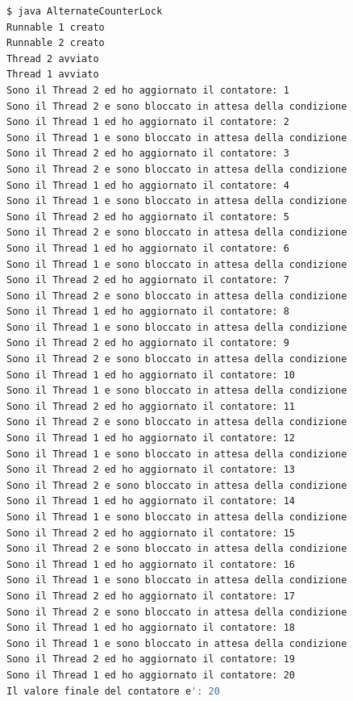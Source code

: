 \begin{lstlisting}[language=Bash]
$ java AlternateCounterLock
Runnable 1 creato
Runnable 2 creato
Thread 2 avviato
Thread 1 avviato
Sono il Thread 2 ed ho aggiornato il contatore: 1
Sono il Thread 2 e sono bloccato in attesa della condizione
Sono il Thread 1 ed ho aggiornato il contatore: 2
Sono il Thread 1 e sono bloccato in attesa della condizione
Sono il Thread 2 ed ho aggiornato il contatore: 3
Sono il Thread 2 e sono bloccato in attesa della condizione
Sono il Thread 1 ed ho aggiornato il contatore: 4
Sono il Thread 1 e sono bloccato in attesa della condizione
Sono il Thread 2 ed ho aggiornato il contatore: 5
Sono il Thread 2 e sono bloccato in attesa della condizione
Sono il Thread 1 ed ho aggiornato il contatore: 6
Sono il Thread 1 e sono bloccato in attesa della condizione
Sono il Thread 2 ed ho aggiornato il contatore: 7
Sono il Thread 2 e sono bloccato in attesa della condizione
Sono il Thread 1 ed ho aggiornato il contatore: 8
Sono il Thread 1 e sono bloccato in attesa della condizione
Sono il Thread 2 ed ho aggiornato il contatore: 9
Sono il Thread 2 e sono bloccato in attesa della condizione
Sono il Thread 1 ed ho aggiornato il contatore: 10
Sono il Thread 1 e sono bloccato in attesa della condizione
Sono il Thread 2 ed ho aggiornato il contatore: 11
Sono il Thread 2 e sono bloccato in attesa della condizione
Sono il Thread 1 ed ho aggiornato il contatore: 12
Sono il Thread 1 e sono bloccato in attesa della condizione
Sono il Thread 2 ed ho aggiornato il contatore: 13
Sono il Thread 2 e sono bloccato in attesa della condizione
Sono il Thread 1 ed ho aggiornato il contatore: 14
Sono il Thread 1 e sono bloccato in attesa della condizione
Sono il Thread 2 ed ho aggiornato il contatore: 15
Sono il Thread 2 e sono bloccato in attesa della condizione
Sono il Thread 1 ed ho aggiornato il contatore: 16
Sono il Thread 1 e sono bloccato in attesa della condizione
Sono il Thread 2 ed ho aggiornato il contatore: 17
Sono il Thread 2 e sono bloccato in attesa della condizione
Sono il Thread 1 ed ho aggiornato il contatore: 18
Sono il Thread 1 e sono bloccato in attesa della condizione
Sono il Thread 2 ed ho aggiornato il contatore: 19
Sono il Thread 1 ed ho aggiornato il contatore: 20
Il valore finale del contatore e': 20
\end{lstlisting}
